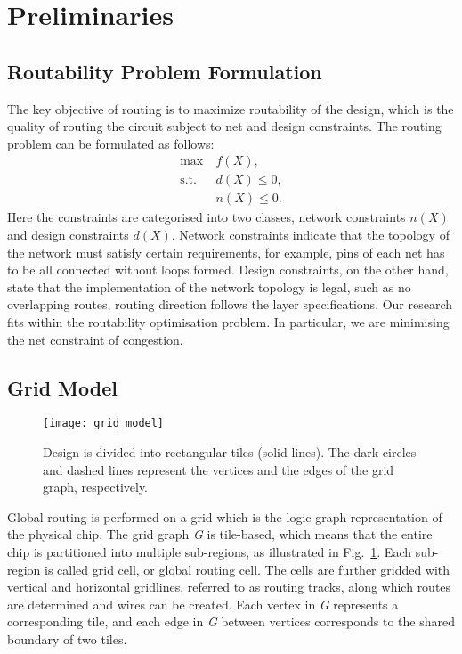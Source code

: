 \section{Preliminaries}
\label{sec:prelim}

\subsection{Routability Problem Formulation}
The key objective of routing is to maximize routability of the design, which is the quality of routing the circuit subject to net and design constraints.
The routing problem can be formulated as follows:
\begin{subequations}
\begin{align*}
    \max  \       & f(X), \\
    \text{s.t.}~~ & d(X) \leq 0, \\
                  & n(X) \leq 0.
\end{align*}
\end{subequations}
Here the constraints are categorised into two classes, network constraints $n(X)$ and design constraints $d(X)$. Network constraints indicate that the topology of the network must satisfy certain requirements, for example, pins of each net has to be all connected without loops formed. Design constraints, on the other hand, state that the implementation of the network topology is legal, such as no overlapping routes, routing direction follows the layer specifications. Our research fits within the routability optimisation problem. In particular, we are minimising the net constraint of congestion.

\subsection{Grid Model}
\label{subsec:grid model}

\begin{figure}[tb!]
    \centering
    \texttt{[image: grid\_model]}
	\caption{Design is divided into rectangular tiles (solid lines). The dark
		circles and dashed lines represent the vertices and the edges of the grid graph, respectively.}
	\label{fig:grid_model}
\end{figure}

Global routing is performed on a grid which is the logic graph representation of the physical chip. The grid graph \emph{G} is tile-based, which means that the entire chip is partitioned into multiple sub-regions, as illustrated in Fig.~\ref{fig:grid_model}. Each sub-region is called grid cell, or global routing cell. The cells are further gridded with vertical and horizontal gridlines, referred to as routing tracks, along which routes are determined and wires can be created. Each vertex in \emph{G} represents a corresponding tile, and each edge in \emph{G} between vertices corresponds to the shared boundary of two tiles.

